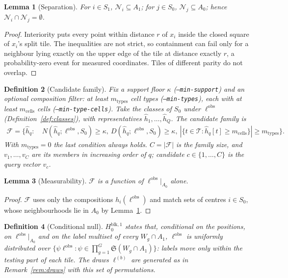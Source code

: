 \documentclass[11pt,a4paper]{article}
\newtheorem{definition}{Definition}[section]
\newtheorem{lemma}[definition]{Lemma}
\theoremstyle{remark}
\newcommand{\types}{\mathcal{T}}
\newcommand{\lab}{\ell}
\newcommand{\obs}{\mathrm{obs}}
\newcommand{\Nb}[1]{\mathcal{N}_{#1}}
\newcommand{\Sym}{\mathfrak{S}}
\newcommand{\mtypes}{m_{\mathrm{types}}}
\newcommand{\mcells}{m_{\mathrm{cells}}}
\begin{document}
\begin{lemma}[Separation]
\label{lem:sep}
For $i\in S_1$, $\Nb{i}\subseteq A_1$; for $j\in S_0$, $\Nb{j}\subseteq A_0$;
hence $\Nb{i}\cap\Nb{j}=\emptyset$.
\end{lemma}

\begin{proof}
Interiority puts every point within distance $r$ of $x_i$ inside the closed
square of $x_i$'s split tile. The inequalities are not strict, so containment
can fail only for a neighbour lying exactly on the upper edge of the tile at
distance exactly $r$, a probability-zero event for measured coordinates.
Tiles of different parity do not overlap.
\end{proof}

\begin{definition}[Candidate family]
\label{def:family}
Fix a support floor $\kappa$ (\texttt{--min-support}) and an optional
composition filter: at least $\mtypes$ cell types (\texttt{--min-types}), each
with at least $\mcells$ cells (\texttt{--min-type-cells}). Take the classes of
$S_0$ under $\lab^{\obs}$ (Definition~\ref{def:classes}), with
representatives $\hat h_1,\dots,\hat h_Q$. The candidate family is
\begin{align*}
  \mathcal F=\bigl\{\hat h_q:\ &N(\hat h_q;\lab^{\obs},S_0)\ge \kappa,\
  D(\hat h_q;\lab^{\obs},S_0)\ge \kappa,\
  |\{t\in\types:\hat h_q[t]\ge \mcells\}|\ge \mtypes\bigr\}.
\end{align*}
With $\mtypes=0$ the last condition always holds. $C=|\mathcal F|$ is the
family size, and $v_1,\dots,v_C$ are its members in increasing order of $q$;
candidate $c\in\{1,\dots,C\}$ is the query vector $v_c$.
\end{definition}

\begin{lemma}[Measurability]
\label{lem:meas}
$\mathcal F$ is a function of $\lab^{\obs}|_{A_0}$ alone.
\end{lemma}

\begin{proof}
$\mathcal F$ uses only the compositions $h_i(\lab^{\obs})$ and match sets of
centres $i\in S_0$, whose neighbourhoods lie in $A_0$ by
Lemma~\ref{lem:sep}.
\end{proof}

\begin{definition}[Conditional null]
\label{def:condnull}
$H_0^{\mathrm{blk},1}$ states that, conditional on the positions, on
$\lab^{\obs}|_{A_0}$ and on the label multiset of every $W_g\cap A_1$,
$\lab^{\obs}$ is uniformly distributed over
$\{\psi\lab^{\obs}:\psi\in\prod_{g=1}^G\Sym(W_g\cap A_1)\}$: labels move only
within the testing part of each tile. The draws $\lab^{(b)}$ are generated as
in Remark~\ref{rem:draws} with this set of permutations.
\end{definition}
\end{document}
